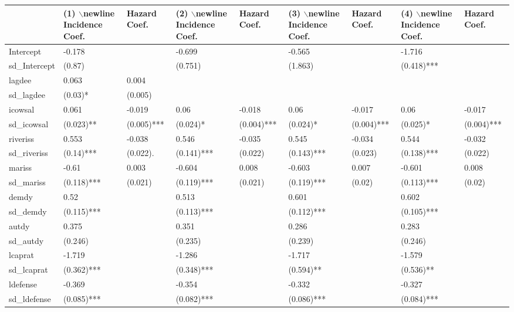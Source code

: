 \begin{table}[ht]
\centering
\begin{tabular}{lllllllll}
  \hline
  & (1) $\backslash$newline Incidence Coef. &  Hazard Coef. & (2) $\backslash$newline Incidence Coef. &  Hazard Coef. & (3) $\backslash$newline Incidence Coef. &  Hazard Coef. & (4) $\backslash$newline Incidence Coef. &  Hazard Coef. \\ 
  \hline
Intercept & -0.178 &  & -0.699 &  & -0.565 &  & -1.716 &  \\ 
  sd\_Intercept & (0.87)  &  & (0.751)  &  & (1.863)  &  & (0.418)*** &  \\ 
  lagdee & 0.063 & 0.004 &  &  &  &  &  &  \\ 
  sd\_lagdee & (0.03)* & (0.005)  &  &  &  &  &  &  \\ 
  icowsal & 0.061 & -0.019 & 0.06 & -0.018 & 0.06 & -0.017 & 0.06 & -0.017 \\ 
  sd\_icowsal & (0.023)** & (0.005)*** & (0.024)* & (0.004)*** & (0.024)* & (0.004)*** & (0.025)* & (0.004)*** \\ 
  riveriss & 0.553 & -0.038 & 0.546 & -0.035 & 0.545 & -0.034 & 0.544 & -0.032 \\ 
  sd\_riveriss & (0.14)*** & (0.022). & (0.141)*** & (0.022)  & (0.143)*** & (0.023)  & (0.138)*** & (0.022)  \\ 
  mariss & -0.61 & 0.003 & -0.604 & 0.008 & -0.603 & 0.007 & -0.601 & 0.008 \\ 
  sd\_mariss & (0.118)*** & (0.021)  & (0.119)*** & (0.021)  & (0.119)*** & (0.02)  & (0.113)*** & (0.02)  \\ 
  demdy & 0.52 &  & 0.513 &  & 0.601 &  & 0.602 &  \\ 
  sd\_demdy & (0.115)*** &  & (0.113)*** &  & (0.112)*** &  & (0.105)*** &  \\ 
  autdy & 0.375 &  & 0.351 &  & 0.286 &  & 0.283 &  \\ 
  sd\_autdy & (0.246)  &  & (0.235)  &  & (0.239)  &  & (0.246)  &  \\ 
  lcaprat & -1.719 &  & -1.286 &  & -1.717 &  & -1.579 &  \\ 
  sd\_lcaprat & (0.362)*** &  & (0.348)*** &  & (0.594)** &  & (0.536)** &  \\ 
  ldefense & -0.369 &  & -0.354 &  & -0.332 &  & -0.327 &  \\ 
  sd\_ldefense & (0.085)*** &  & (0.082)*** &  & (0.086)*** &  & (0.084)*** &  \\ 

\end{tabular}
\end{table}

